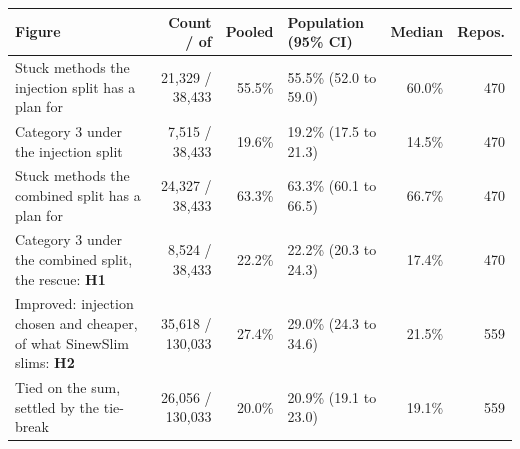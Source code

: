 \begin{tabular}{>{\raggedright\arraybackslash}p{4.7cm}rrlrr}
\toprule
Figure & Count / of & Pooled & Population (95\% CI) & Median & Repos. \\
\midrule
Stuck methods the injection split has a plan for & 21{,}329 / 38{,}433 & 55.5\% & 55.5\% (52.0 to 59.0) & 60.0\% & 470 \\
Category 3 under the injection split & 7{,}515 / 38{,}433 & 19.6\% & 19.2\% (17.5 to 21.3) & 14.5\% & 470 \\
Stuck methods the combined split has a plan for & 24{,}327 / 38{,}433 & 63.3\% & 63.3\% (60.1 to 66.5) & 66.7\% & 470 \\
Category 3 under the combined split, the rescue: \textbf{H1} & 8{,}524 / 38{,}433 & 22.2\% & 22.2\% (20.3 to 24.3) & 17.4\% & 470 \\
Improved: injection chosen and cheaper, of what SinewSlim slims: \textbf{H2} & 35{,}618 / 130{,}033 & 27.4\% & 29.0\% (24.3 to 34.6) & 21.5\% & 559 \\
Tied on the sum, settled by the tie-break & 26{,}056 / 130{,}033 & 20.0\% & 20.9\% (19.1 to 23.0) & 19.1\% & 559 \\
\bottomrule
\end{tabular}
